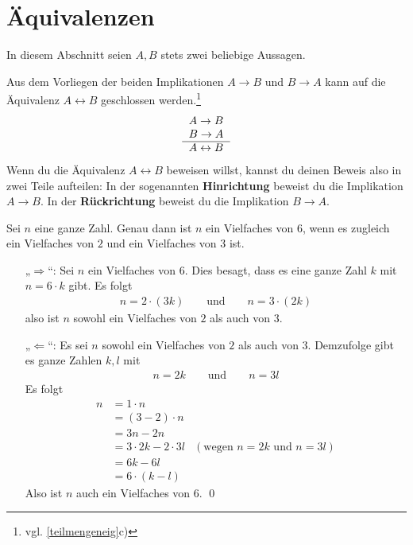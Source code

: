 \section{Äquivalenzen}


In diesem Abschnitt seien $A,B$ stets zwei beliebige Aussagen.


\begin{axiom} \label{hinruck}   
    Aus dem Vorliegen der beiden Implikationen $A\to B$ und $B\to A$ kann auf die Äquivalenz $A\leftrightarrow B$ geschlossen werden.\footnote{vgl. \cref{teilmengeneig}c)}
    \[\begin{tabular}{r}
        $A\to B$ \\
        $B\to A$ \\
        \hline
        $A\leftrightarrow B$
    \end{tabular}\]
    Wenn du die Äquivalenz $A\leftrightarrow B$ beweisen willst, kannst du deinen Beweis also in zwei Teile aufteilen: In der sogenannten \textbf{Hinrichtung} beweist du die Implikation $A\to B$. In der \textbf{Rückrichtung} beweist du die Implikation $B\to A$.
\end{axiom}


\begin{bsp} \label{bsp:hinruck}
    Sei $n$ eine ganze Zahl. Genau dann ist $n$ ein Vielfaches von $6$, wenn es zugleich ein Vielfaches von $2$ und ein Vielfaches von $3$ ist.
\end{bsp}


\begin{bew}
    \begin{enumerate}
        \item[„$\Rightarrow$“:] Sei $n$ ein Vielfaches von $6$. Dies besagt, dass es eine ganze Zahl $k$ mit $n=6\cdot k$ gibt. Es folgt
        \begin{align*}
            n= 2\cdot (3k) \qquad\text{und}\qquad n = 3\cdot (2k)
        \end{align*}
        also ist $n$ sowohl ein Vielfaches von $2$ als auch von $3$.
        \item[„$\Leftarrow$“:] Es sei $n$ sowohl ein Vielfaches von $2$ als auch von $3$. Demzufolge gibt es ganze Zahlen $k,l$ mit
        \begin{align*}
            n = 2k\qquad \text{und}\qquad n  = 3l
        \end{align*}
        Es folgt
        \begin{align*}
            n & = 1\cdot n \\
            & = (3-2)\cdot n \\
            & = 3n - 2n \\
            & = 3\cdot 2k - 2\cdot 3l & (\text{wegen $n=2k$ und $n=3l$})\\
            & = 6k - 6l \\
            & = 6\cdot (k-l)
        \end{align*}
        Also ist $n$ auch ein Vielfaches von $6$. \qed
    \end{enumerate}
\end{bew}


